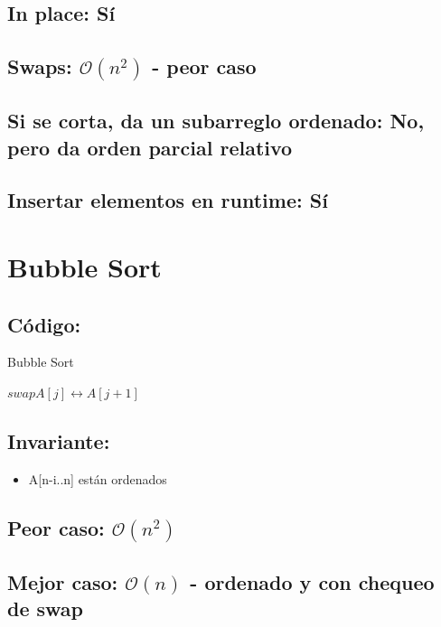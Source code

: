\documentclass[a4paper]{article}
\begin{document}
\subsection{In place: S\'i}
\subsection{Swaps: $\mathcal{O}(n^{2})$ - peor caso}
\subsection{Si se corta, da un subarreglo ordenado: No, pero da orden parcial relativo}
\subsection{Insertar elementos en runtime: S\'i}

\newpage
\section{Bubble Sort}

\subsection{C\'odigo:}
\begin{algorithm}
\caption{Bubble Sort}\label{selection}
\begin{algorithmic}[1]
			\State $swap A[j] \leftrightarrow A[j+1]$
		\EndIf
	\EndFor
    \EndFor
\EndProcedure
\end{algorithmic}
\end{algorithm}

\subsection{Invariante:}
\begin{itemize}
	\item{A[n-i..n] est\'an ordenados}
\end{itemize}

\subsection{Peor caso: $\mathcal{O}(n^{2})$}
\subsection{Mejor caso: $\mathcal{O}(n)$ - ordenado y con chequeo de swap}
\end{document}
